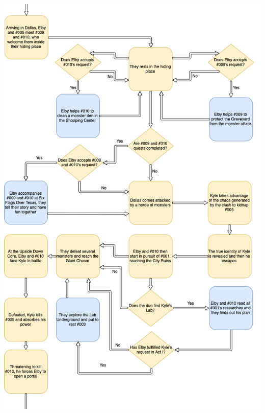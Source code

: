\begin{center}
	\includegraphics[width=0.99\linewidth]{images/graphs/story_flowchart_2.png}
\end{center}



